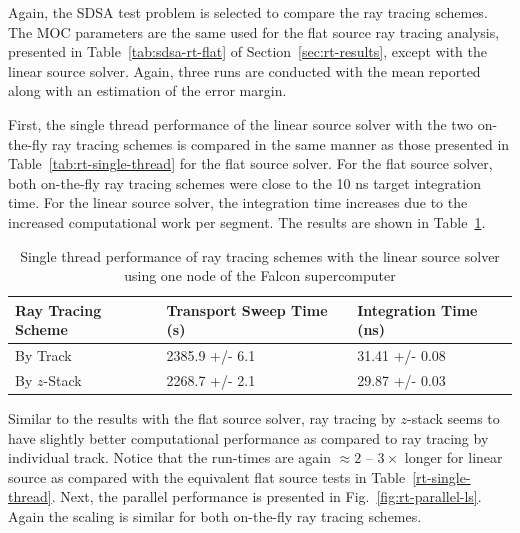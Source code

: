 Again, the SDSA test problem is selected to compare the ray tracing schemes. The \ac{MOC} parameters are the same used for the flat source ray tracing analysis, presented in Table~\ref{tab:sdsa-rt-flat} of Section~\ref{sec:rt-results}, except with the linear source solver. Again, three runs are conducted with the mean reported along with an estimation of the error margin.

First, the single thread performance of the linear source solver with the two on-the-fly ray tracing schemes is compared in the same manner as those presented in Table~\ref{tab:rt-single-thread} for the flat source solver. For the flat source solver, both on-the-fly ray tracing schemes were close to the 10 ns target integration time. For the linear source solver, the integration time increases due to the increased computational work per segment. The results are shown in Table~\ref{tab:rt-single-thread-ls}.

\begin{table}[ht]
	\centering
	\caption{Single thread performance of ray tracing schemes with the linear source solver using one node of the Falcon supercomputer}
	\medskip
	\begin{tabular}{l|l|l}
		\hline
		Ray Tracing Scheme & Transport Sweep Time (s) & Integration Time (ns) \\
		\hline
		By Track & 2385.9 +/- 6.1 & 31.41 +/- 0.08 \\
		By $z$-Stack & 2268.7 +/- 2.1 & 29.87 +/- 0.03 \\
		\hline
	\end{tabular}
	\label{tab:rt-single-thread-ls}
\end{table}

Similar to the results with the flat source solver, ray tracing by $z$-stack seems to have slightly better computational performance as compared to ray tracing by individual track. Notice that the run-times are again $\approx 2$ -- $3\times$ longer for linear source as compared with the equivalent flat source tests in Table~\ref{rt-single-thread}. Next, the parallel performance is presented in Fig.~\ref{fig:rt-parallel-ls}. Again the scaling is similar for both on-the-fly ray tracing schemes.


